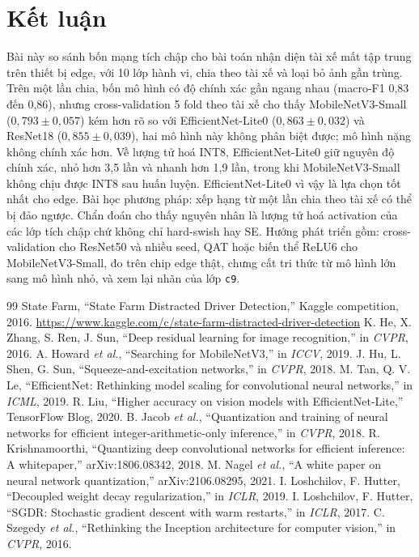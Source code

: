\documentclass[10pt,a4paper,twocolumn]{article}
\newcommand{\cls}[1]{\texttt{#1}}
\begin{document}
\section{Kết luận}
Bài này so sánh bốn mạng tích chập cho bài toán nhận diện tài xế mất tập trung trên thiết bị edge, với 10 lớp hành vi, chia theo tài xế và loại bỏ ảnh gần trùng. Trên một lần chia, bốn mô hình có độ chính xác gần ngang nhau (macro-F1 0,83 đến 0,86), nhưng cross-validation 5 fold theo tài xế cho thấy MobileNetV3-Small ($0{,}793 \pm 0{,}057$) kém hơn rõ so với EfficientNet-Lite0 ($0{,}863 \pm 0{,}032$) và ResNet18 ($0{,}855 \pm 0{,}039$), hai mô hình này không phân biệt được; mô hình nặng không chính xác hơn. Về lượng tử hoá INT8, EfficientNet-Lite0 giữ nguyên độ chính xác, nhỏ hơn 3,5 lần và nhanh hơn 1,9 lần, trong khi MobileNetV3-Small không chịu được INT8 sau huấn luyện. EfficientNet-Lite0 vì vậy là lựa chọn tốt nhất cho edge. Bài học phương pháp: xếp hạng từ một lần chia theo tài xế có thể bị đảo ngược. Chẩn đoán cho thấy nguyên nhân là lượng tử hoá activation của các lớp tích chập chứ không chỉ hard-swish hay SE. Hướng phát triển gồm: cross-validation cho ResNet50 và nhiều seed, QAT hoặc biến thể ReLU6 cho MobileNetV3-Small, đo trên chip edge thật, chưng cất tri thức từ mô hình lớn sang mô hình nhỏ, và xem lại nhãn của lớp \cls{c9}.

\begin{thebibliography}{99}\small
{} State Farm, ``State Farm Distracted Driver Detection,'' Kaggle competition, 2016. \url{https://www.kaggle.com/c/state-farm-distracted-driver-detection}
 K. He, X. Zhang, S. Ren, J. Sun, ``Deep residual learning for image recognition,'' in \emph{CVPR}, 2016.
 A. Howard \emph{et al.}, ``Searching for MobileNetV3,'' in \emph{ICCV}, 2019.
 J. Hu, L. Shen, G. Sun, ``Squeeze-and-excitation networks,'' in \emph{CVPR}, 2018.
 M. Tan, Q. V. Le, ``EfficientNet: Rethinking model scaling for convolutional neural networks,'' in \emph{ICML}, 2019.
 R. Liu, ``Higher accuracy on vision models with EfficientNet-Lite,'' TensorFlow Blog, 2020.
 B. Jacob \emph{et al.}, ``Quantization and training of neural networks for efficient integer-arithmetic-only inference,'' in \emph{CVPR}, 2018.
 R. Krishnamoorthi, ``Quantizing deep convolutional networks for efficient inference: A whitepaper,'' arXiv:1806.08342, 2018.
 M. Nagel \emph{et al.}, ``A white paper on neural network quantization,'' arXiv:2106.08295, 2021.
 I. Loshchilov, F. Hutter, ``Decoupled weight decay regularization,'' in \emph{ICLR}, 2019.
 I. Loshchilov, F. Hutter, ``SGDR: Stochastic gradient descent with warm restarts,'' in \emph{ICLR}, 2017.
 C. Szegedy \emph{et al.}, ``Rethinking the Inception architecture for computer vision,'' in \emph{CVPR}, 2016.
\end{thebibliography}
\end{document}
